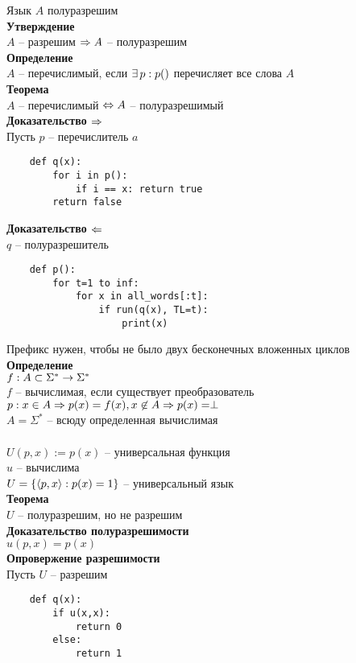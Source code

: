 \documentclass[12pt]{article}
\begin{document}
Язык $A$ полуразрешим\\
\textbf{Утверждение}\\
$A$ -- разрешим $\Rightarrow A$ -- полуразрешим\\
\textbf{Определение}\\
$A$ -- перечислимый, если $\exists\, p: p()$ перечисляет все слова $A$\\
\textbf{Теорема}\\
$A$ -- перечислимый $\Leftrightarrow A$ -- полуразрешимый\\
\textbf{Доказательство $\Rightarrow$}\\
Пусть $p$ -- перечислитель $a$\\
\begin{lstlisting}
    def q(x):
        for i in p():
            if i == x: return true
        return false
\end{lstlisting}
\textbf{Доказательство $\Leftarrow$}\\
$q$ -- полуразрешитель\\
\begin{lstlisting}
    def p():
        for t=1 to inf:
            for x in all_words[:t]:
                if run(q(x), TL=t):
                    print(x)
\end{lstlisting}
Префикс нужен, чтобы не было двух бесконечных вложенных циклов\\
\textbf{Определение}\\
$f:A \subset \Sigma^*\rightarrow \Sigma^*$\\
$f$ -- вычислимая, если существует преобразователь $p: x\in A\Rightarrow p(x)=f(x), x \not\in A\Rightarrow p(x)=\perp$\\
$A=\Sigma^*$ -- всюду определенная вычислимая\\\\
$U(p,x) := p(x)$ -- универсальная функция\\
$u$ -- вычислима\\
$U=\{\langle p,x\rangle: p(x)=1\}$ -- универсальный язык\\
\textbf{Теорема}\\
$U$ -- полуразрешим, но не разрешим\\
\textbf{Доказательство полуразрешимости}\\
$u(p,x) = p(x)$\\
\textbf{Опровержение разрешимости}\\
Пусть $U$ -- разрешим\\
\begin{lstlisting}
    def q(x):
        if u(x,x):
            return 0
        else:
            return 1
\end{lstlisting}
\end{document}
